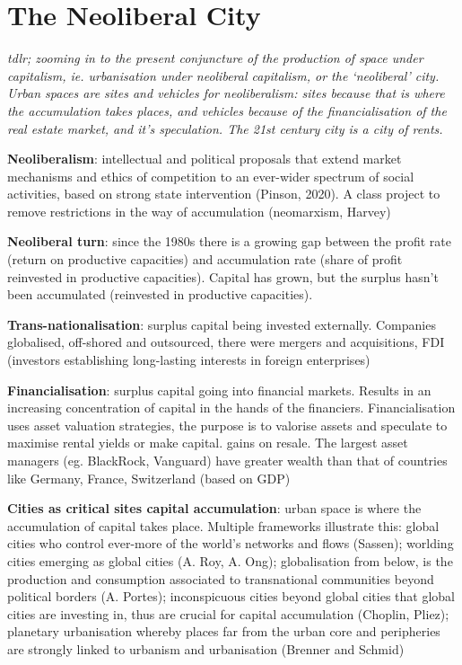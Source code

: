 \documentclass{article}
\begin{document}
\pagebreak
\section{The Neoliberal City}

\textit{tdlr; zooming in to the present conjuncture of the production of space under capitalism, ie. urbanisation under neoliberal capitalism, or the ‘neoliberal’ city. Urban spaces are sites and vehicles for neoliberalism: sites because that is where the accumulation takes places, and vehicles because of the financialisation of the real estate market, and it’s speculation. The 21st century city is a city of rents.}

\textbf{Neoliberalism}: intellectual and political proposals that extend market mechanisms and ethics of competition to an ever-wider spectrum of social activities, based on strong state intervention (Pinson, 2020). A class project to remove restrictions in the way of accumulation (neomarxism, Harvey)

\textbf{Neoliberal turn}: since the 1980s there is a growing gap between the profit rate (return on productive capacities) and accumulation rate (share of profit reinvested in productive capacities). Capital has grown, but the surplus hasn't been accumulated (reinvested in productive capacities).

\textbf{Trans-nationalisation}: surplus capital being invested externally. Companies globalised, off-shored and outsourced, there were mergers and acquisitions, FDI (investors establishing long-lasting interests in foreign enterprises)

\textbf{Financialisation}: surplus capital going into financial markets. Results in an increasing concentration of capital in the hands of the financiers. Financialisation uses asset valuation strategies, the purpose is to valorise assets and speculate to maximise rental yields or make capital. gains on resale. The largest asset managers (eg. BlackRock, Vanguard) have greater wealth than that of countries like Germany, France, Switzerland (based on GDP)

\textbf{Cities as critical sites capital accumulation}: urban space is where the accumulation of capital takes place. Multiple frameworks illustrate this: global cities who control ever-more of the world's networks and flows (Sassen); worlding cities emerging as global cities (A. Roy, A. Ong); globalisation from below, is the production and consumption associated to transnational communities beyond political borders (A. Portes); inconspicuous cities beyond global cities that global cities are investing in, thus are crucial for capital accumulation (Choplin, Pliez); planetary urbanisation whereby places far from the urban core and peripheries are strongly linked to urbanism and urbanisation (Brenner and Schmid)
\end{document}
